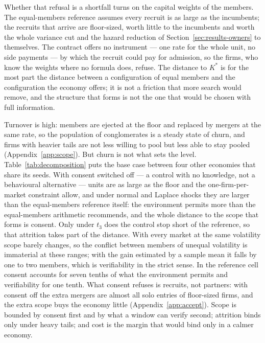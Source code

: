 

Whether that refusal is a shortfall turns on the capital weights of the members. The equal-members reference assumes every recruit is as large as the incumbents; the recruits that arrive are floor-sized, worth little to the incumbents and worth the whole variance cut and the hazard reduction of Section~\ref{sec:results-owners} to themselves. The contract offers no instrument --- one rate for the whole unit, no side payments --- by which the recruit could pay for admission, so the firms, who know the weights where no formula does, refuse. The distance to $K^*$ is for the most part the distance between a configuration of equal members and the configuration the economy offers; it is not a friction that more search would remove, and the structure that forms is not the one that would be chosen with full information.

Turnover is high: members are ejected at the floor and replaced by mergers at the same rate, so the population of conglomerates is a steady state of churn, and firms with heavier tails are not less willing to pool but less able to stay pooled (Appendix~\ref{app:scope}). But churn is not what sets the level. Table~\ref{tab:decomposition} puts the base case between four other economies that share its seeds. With consent switched off --- a control with no knowledge, not a behavioural alternative --- units are as large as the floor and the one-firm-per-market constraint allow, and under normal and Laplace shocks they are larger than the equal-members reference itself: the environment permits more than the equal-members arithmetic recommends, and the whole distance to the scope that forms is consent. Only under $t_3$ does the control stop short of the reference, so that attrition takes part of the distance. With every market at the same volatility scope barely changes, so the conflict between members of unequal volatility is immaterial at these ranges; with the gain estimated by a sample mean it falls by one to two members, which is verifiability in the strict sense. In the reference cell consent accounts for seven tenths of what the environment permits and verifiability for one tenth. What consent refuses is recruits, not partners: with consent off the extra mergers are almost all solo entries of floor-sized firms, and the extra scope buys the economy little (Appendix~\ref{app:accept}). Scope is bounded by consent first and by what a window can verify second; attrition binds only under heavy tails; and cost is the margin that would bind only in a calmer economy.

